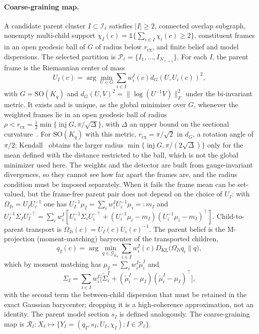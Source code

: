 \documentclass[11pt]{article}
\begin{document}
\paragraph{Coarse-graining map.}
A candidate parent cluster $I \subset \mathcal{I}_\ell$ satisfies $|I| \ge 2$, connected overlap subgraph, nonempty multi-child support $\chi_I(c) = \mathbb{1}\{\sum_{i \in I}\chi_i(c) \ge 2\}$, constituent frames in an open geodesic ball of $G$ of radius below $r_{\mathrm{cx}}$, and finite belief and model dispersions. The selected partition is $\mathcal{P}_\ell = \{I_1, \ldots, I_{N_{\ell+1}}\}$. For each $I$, the parent frame is the Riemannian center of mass
\begin{equation}
U_I(c) = \arg\min_{U \in G} \sum_{i \in I} w_i^I(c) d_G(U, U_i(c))^2,
\end{equation}
with $G = \mathrm{SO}(K_q)$ and $d_G(U, V)^2 = \|\log(U^{-1}V)\|_F^2$ under the bi-invariant metric. It exists and is unique, as the global minimizer over $G$, whenever the weighted frames lie in an open geodesic ball of radius $\rho<r_{\mathrm{cx}}=\tfrac12\min\{\operatorname{inj}G,\pi/\sqrt{\Delta}\}$, with $\Delta$ an upper bound on the sectional curvature~\cite[Thm.~2.1]{Afsari2011}. For $\mathrm{SO}(K_q)$ with this metric, $r_{\mathrm{cx}}=\pi/\sqrt2$ in $d_G$, a rotation angle of $\pi/2$; Kendall~\cite{Kendall1990} obtains the larger radius $\min\{\operatorname{inj}G,\pi/(2\sqrt{\Delta})\}$ only for the mean defined with the distance restricted to the ball, which is not the global minimizer used here. The weights and the detector are built from gauge-invariant divergences, so they cannot see how far apart the frames are, and the radius condition must be imposed separately. When it fails the frame mean can be set-valued, but the frame-free parent pair does not depend on the choice of $U_I$: with $\Omega_{Ii}=U_IU_i^{-1}$ one has $U_I^{-1}\mu_I=\sum_iw_i^IU_i^{-1}\mu_i=:m_I$ and $U_I^{-1}\Sigma_IU_I^{-\top}=\sum_iw_i^I[U_i^{-1}\Sigma_iU_i^{-\top}+(U_i^{-1}\mu_i-m_I)(U_i^{-1}\mu_i-m_I)^\top]$. Child-to-parent transport is $\Omega_{Ii}(c) = U_I(c)U_i(c)^{-1}$. The parent belief is the M-projection (moment-matching) barycenter of the transported children,
\begin{equation}
q_I(c) = \arg\min_{q \in \mathcal{G}_{K_q}} \sum_{i \in I} w_i^I(c) D_{\mathrm{KL}}\big(\Omega_{Ii}q_i \| q\big),
\end{equation}
which by moment matching has $\mu_I = \sum_i w_i^I \widetilde{\mu}_i^I$ and
\begin{equation}
\Sigma_I = \sum_{i \in I} w_i^I\big[\widetilde{\Sigma}_i^I + (\widetilde{\mu}_i^I - \mu_I)(\widetilde{\mu}_i^I - \mu_I)^\top\big],
\end{equation}
with the second term the between-child dispersion that must be retained in the exact Gaussian barycenter; dropping it is a high-coherence approximation, not an identity. The parent model section $s_I$ is defined analogously. The coarse-graining map is $\mathcal{R}_\ell : X_\ell \mapsto \{Y_I = (q_I, s_I, U_I, \chi_I) : I \in \mathcal{P}_\ell\}$.
\end{document}
